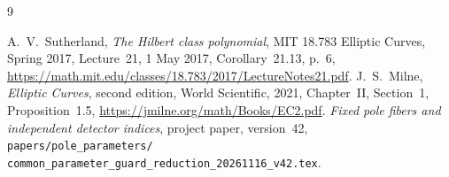 \documentclass[11pt,a4paper]{article}
\begin{document}
\begin{thebibliography}{9}\raggedright
{}
A.~V.~Sutherland, \emph{The Hilbert class polynomial},
MIT 18.783 Elliptic Curves, Spring 2017, Lecture~21,
1 May 2017, Corollary~21.13, p.~6,
\url{https://math.mit.edu/classes/18.783/2017/LectureNotes21.pdf}.
J.~S.~Milne, \emph{Elliptic Curves}, second edition,
World Scientific, 2021,
Chapter~II, Section~1, Proposition~1.5,
\url{https://jmilne.org/math/Books/EC2.pdf}.
\emph{Fixed pole fibers and independent detector indices},
project paper, version~42,
\texttt{papers/pole\_parameters/}\allowbreak
\texttt{common\_parameter\_guard\_reduction\_20261116\_v42.tex}.
\end{thebibliography}
\end{document}
